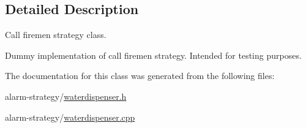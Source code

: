 \subsection{Detailed Description}
Call firemen strategy class. 

Dummy implementation of call firemen strategy. Intended for testing purposes. 

The documentation for this class was generated from the following files\+:\begin{DoxyCompactItemize}
\item 
alarm-\/strategy/\hyperlink{waterdispenser_8h}{waterdispenser.\+h}\item 
alarm-\/strategy/\hyperlink{waterdispenser_8cpp}{waterdispenser.\+cpp}\end{DoxyCompactItemize}
